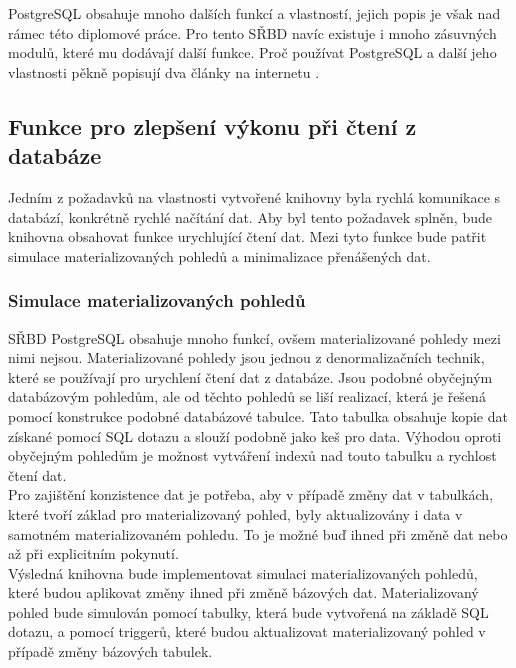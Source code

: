 \documentclass[ing,male,java,dept456]{diploma}						%
\begin{document}
PostgreSQL obsahuje mnoho dalších funkcí a vlastností, jejich popis je však nad rámec této diplomové práce. Pro tento SŘBD navíc existuje i mnoho zásuvných modulů, které mu dodávají další funkce. Proč používat PostgreSQL a další jeho vlastnosti pěkně popisují dva články na internetu \cite{postgre, postgre2}.

\subsection{Funkce pro zlepšení výkonu při čtení z databáze}
\label{subsec:ReadOpt}

Jedním z požadavků na vlastnosti vytvořené knihovny byla rychlá komunikace s databází, konkrétně rychlé načítání dat. Aby byl tento požadavek splněn, bude knihovna obsahovat funkce urychlující čtení dat. Mezi tyto funkce bude patřit simulace materializovaných pohledů a minimalizace přenášených dat.

\subsubsection{Simulace materializovaných pohledů}

SŘBD PostgreSQL obsahuje mnoho funkcí, ovšem materializované pohledy mezi nimi nejsou. Materializované pohledy jsou jednou z denormalizačních technik, které se používají pro urychlení čtení dat z databáze. Jsou podobné obyčejným databázovým pohledům, ale od těchto pohledů se liší realizací, která je řešená pomocí konstrukce podobné databázové tabulce. Tato tabulka obsahuje kopie dat získané pomocí SQL dotazu a slouží podobně jako keš pro data. Výhodou oproti obyčejným pohledům je možnost vytváření indexů nad touto tabulku a rychlost čtení dat. \\
Pro zajištění konzistence dat je potřeba, aby v případě změny dat v tabulkách, které tvoří základ pro materializovaný pohled, byly aktualizovány i data v samotném materializovaném pohledu. To je možné buď ihned při změně dat nebo až při explicitním pokynutí. \\

Výsledná knihovna bude implementovat simulaci materializovaných pohledů, které budou aplikovat změny ihned při změně bázových dat. Materializovaný pohled bude simulován pomocí tabulky, která bude vytvořená na základě SQL dotazu, a pomocí triggerů, které budou aktualizovat materializovaný pohled v případě změny bázových tabulek. \\
\end{document}
